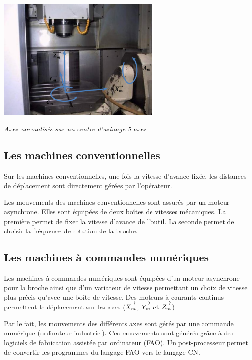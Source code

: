 \documentclass[11pt,oneside]{article}
\begin{document}
\begin{center}
\includegraphics[height=6cm]{png/axes_normalises_2}

\textit{Axes normalisés sur un centre d'usinage 5 axes}
\end{center}

\subsection{Les machines conventionnelles}
Sur les machines conventionnelles, une fois la vitesse d'avance fixée, les distances de déplacement sont directement gérées par l'opérateur. 

Les mouvements des machines conventionnelles sont assurés par un moteur asynchrone. Elles sont équipées de deux  boîtes de vitesses mécaniques. La première permet de fixer la vitesse d'avance de l'outil. La seconde permet de choisir la fréquence de rotation de la broche. 



\subsection{Les machines à commandes numériques}
Les machines à commandes numériques sont équipées d'un moteur asynchrone pour la broche ainsi que d'un variateur de vitesse permettant un choix de vitesse plus précis qu'avec une boîte de vitesse. Des moteurs à courants continus permettent le déplacement sur les axes  ($\overrightarrow{X_m}$, $\overrightarrow{Y_m}$ et $\overrightarrow{Z_m}$). 

Par le fait, les mouvements des différents axes sont gérés par une commande numérique (ordinateur industriel). Ces mouvements sont générés grâce à des logiciels de fabrication assistée par ordinateur (FAO). Un post-processeur permet de convertir les programmes du langage FAO vers le langage CN. 
\end{document}
